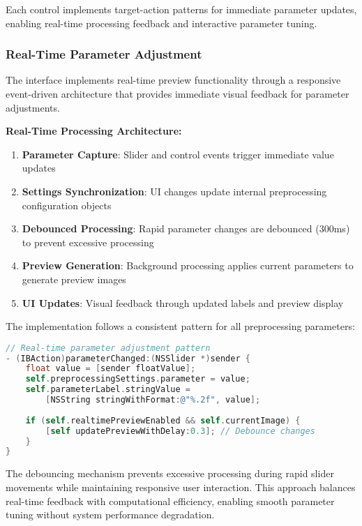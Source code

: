 Each control implements target-action patterns for immediate parameter updates, enabling real-time processing feedback and interactive parameter tuning.

\subsubsection{Real-Time Parameter Adjustment}

The interface implements real-time preview functionality through a responsive event-driven architecture that provides immediate visual feedback for parameter adjustments.

\textbf{Real-Time Processing Architecture:}
\begin{enumerate}
\item \textbf{Parameter Capture}: Slider and control events trigger immediate value updates
\item \textbf{Settings Synchronization}: UI changes update internal preprocessing configuration objects
\item \textbf{Debounced Processing}: Rapid parameter changes are debounced (300ms) to prevent excessive processing
\item \textbf{Preview Generation}: Background processing applies current parameters to generate preview images
\item \textbf{UI Updates}: Visual feedback through updated labels and preview display
\end{enumerate}

The implementation follows a consistent pattern for all preprocessing parameters:

\begin{lstlisting}[language=C,basicstyle=\footnotesize\ttfamily,frame=single,breaklines=true,columns=flexible]
// Real-time parameter adjustment pattern
- (IBAction)parameterChanged:(NSSlider *)sender {
    float value = [sender floatValue];
    self.preprocessingSettings.parameter = value;
    self.parameterLabel.stringValue = 
        [NSString stringWithFormat:@"%.2f", value];
    
    if (self.realtimePreviewEnabled && self.currentImage) {
        [self updatePreviewWithDelay:0.3]; // Debounce changes
    }
}
\end{lstlisting}

The debouncing mechanism prevents excessive processing during rapid slider movements while maintaining responsive user interaction. This approach balances real-time feedback with computational efficiency, enabling smooth parameter tuning without system performance degradation.

